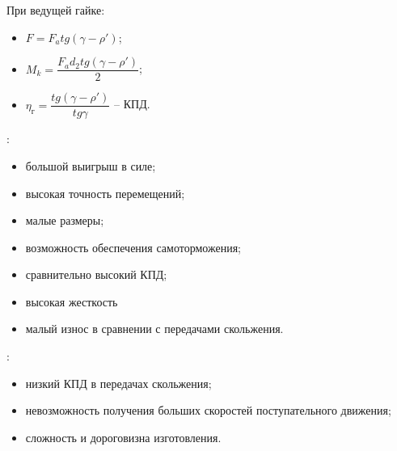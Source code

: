 При ведущей гайке:
\begin{itemize}
	\item $ F = F_a tg(\gamma - \rho') $;
	\item $ M_k = \dfrac{F_a d_2 tg(\gamma - \rho')}{2}$;
	\item $ \eta_\text{г} = \dfrac{tg(\gamma - \rho')}{tg \gamma} $ -- КПД.
\end{itemize}

:
\begin{itemize}
	\item большой выигрыш в силе;
	\item высокая точность перемещений;
	\item малые размеры;
	\item возможность обеспечения самоторможения;
	\item сравнительно высокий КПД;
	\item высокая жесткость
	\item малый износ в сравнении с передачами скольжения.
\end{itemize}

:
\begin{itemize}
	\item низкий КПД в передачах скольжения;
	\item невозможность получения больших скоростей поступательного движения;
	\item сложность и дороговизна изготовления.
\end{itemize}